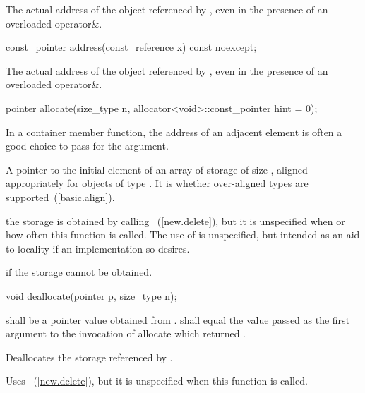 \begin{itemdescr}
\pnum
\returns
The actual address of the object referenced by , even in the presence of an
overloaded operator\&.
\end{itemdescr}

\begin{itemdecl}
const_pointer address(const_reference x) const noexcept;
\end{itemdecl}

\begin{itemdescr}
\pnum
\returns
The actual address of the object referenced by , even in the presence of an
overloaded operator\&.
\end{itemdescr}

\begin{itemdecl}
pointer allocate(size_type n, allocator<void>::const_pointer hint = 0);
\end{itemdecl}

\begin{itemdescr}
\pnum
\enternote In a container member function, the address of an adjacent
element is often a good choice to pass for the  argument. \exitnote

\pnum
\returns
A pointer to the initial element of an array of storage of size 
, aligned appropriately for objects of type .
It is  whether over-aligned types are
supported~(\ref{basic.align}).

\pnum
\note
the storage is obtained by calling ~(\ref{new.delete}), but it is unspecified when or how often this
function is called. The use of  is unspecified, but intended as an aid to
locality if an implementation so desires.

\pnum
\throws
{} if the storage cannot be obtained.
\end{itemdescr}

\begin{itemdecl}
void deallocate(pointer p, size_type n);
\end{itemdecl}

\begin{itemdescr}
\pnum
\requires
{} shall be a pointer value obtained from .
 shall equal the value passed as the first argument
to the invocation of allocate which returned .

\pnum
\effects
Deallocates the storage referenced by  .

\pnum
\notes
Uses
~(\ref{new.delete}), but it is unspecified
when this function is called.
\end{itemdescr}

